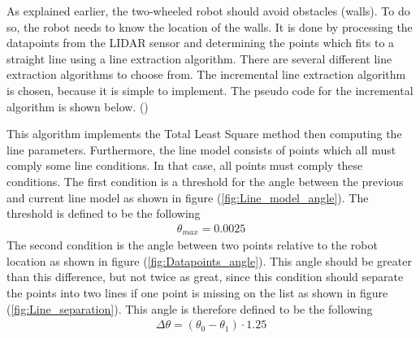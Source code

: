\documentclass[../Head/Main.tex]{subfiles}
\begin{document}
\clearpage
As explained earlier, the two-wheeled robot should avoid obstacles (walls). To do so, the robot needs to know the location of the walls. It is done by processing the datapoints from the LIDAR sensor and determining the points which fits to a straight line using a line extraction algorithm. There are several different line extraction algorithms to choose from. The incremental line extraction algorithm is chosen, because it is simple to implement. The pseudo code for the incremental algorithm is shown below. (\cite{LEA}) \par

This algorithm implements the Total Least Square method then computing the line parameters. Furthermore, the line model consists of points which all must comply some line conditions. In that case, all points must comply these conditions. The first condition is a threshold for the angle between the previous and current line model as shown in figure (\ref{fig:Line_model_angle}). The threshold is defined to be the following 
\begin{align*}
	\theta_{max} = 0.0025
\end{align*}
The second condition is the angle between two points relative to the robot location as shown in figure (\ref{fig:Datapoints_angle}). This angle should be greater than this difference, but not twice as great, since this condition should separate the points into two lines if one point is missing on the list as shown in figure (\ref{fig:Line_separation}). This angle is therefore defined to be the following
\begin{align*}
	\Delta\theta = \left(\theta_0 - \theta_1\right)\cdot 1.25
\end{align*}

\end{document}
